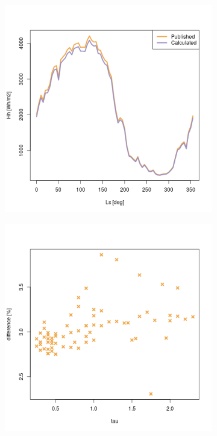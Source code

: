 \begin{figure}[H]
\captionsetup[subfigure]{justification=centering}
\vspace{-2ex}
\centering
    \setlength{\subfigureWidth}{0.50\textwidth}
    \setlength{\graphicsHeight}{80mm}
    \hypersetup{hidelinks=true}%
    \begin{subfigure}[t]{\subfigureWidth}
        \centering
            \includegraphics[height=\graphicsHeight]{sections/appendix/A/plots/hh-exp-calc-at-vl2.png}
            \label{fig:sub:comparative-global-insolation-at-vl2-horizontal-daily-variations}
    \end{subfigure}\hfill
    \begin{subfigure}[t]{\subfigureWidth}
        \centering
            \includegraphics[height=\graphicsHeight]{sections/appendix/A/plots/hh-diff-bet-exp-calc-at-vl2.png}

\end{subfigure}
\end{figure}

